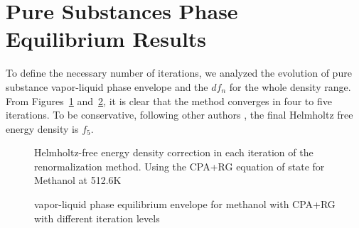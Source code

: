 \documentclass[preprint,12pt,3p]{elsarticle}
\begin{document}
\section{Pure Substances Phase Equilibrium Results}

To define the necessary number of iterations, we analyzed the evolution of pure substance vapor-liquid phase envelope and the $df_{n}$ for the whole density range.
From Figures~\ref{fig:dfn} and~\ref{fig:PV_evol}, it is clear that the method converges in four to five iterations.
To be conservative, following other authors  \cite{llovell2004thermodynamic,cai2004thermodynamics,pcm2017application}, the final Helmholtz free energy density is $f_{5}$.

\begin{figure}[h!]
\centering
\captionsetup{justification=centering}
\caption{Helmholtz-free energy density correction in each iteration of the renormalization method.
Using the CPA+RG equation of state for Methanol at 512.6K}
\label{fig:dfn}
\end{figure}

\begin{figure}[h!]
\centering
\captionsetup{justification=centering}
\caption{vapor-liquid phase equilibrium envelope for methanol with CPA+RG with different iteration levels}
\label{fig:PV_evol}
\end{figure}
\end{document}

